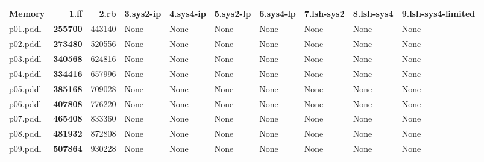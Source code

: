 \documentclass{article}
\begin{document}
\begin{tabular}{@{}lrrrrrrrrr@{}}
Memory & 1.ff & 2.rb & 3.sys2-ip & 4.sys4-ip & 5.sys2-lp & 6.sys4-lp & 7.lsh-sys2 & 8.lsh-sys4 & 9.lsh-sys4-limited \\
\midrule
p01.pddl & \textbf{255700} & 443140 & \multicolumn{1}{|l|}{None} & \multicolumn{1}{|l|}{None} & \multicolumn{1}{|l|}{None} & \multicolumn{1}{|l|}{None} & \multicolumn{1}{|l|}{None} & \multicolumn{1}{|l|}{None} & \multicolumn{1}{|l|}{None} \\
p02.pddl & \textbf{273480} & 520556 & \multicolumn{1}{|l|}{None} & \multicolumn{1}{|l|}{None} & \multicolumn{1}{|l|}{None} & \multicolumn{1}{|l|}{None} & \multicolumn{1}{|l|}{None} & \multicolumn{1}{|l|}{None} & \multicolumn{1}{|l|}{None} \\
p03.pddl & \textbf{340568} & 624816 & \multicolumn{1}{|l|}{None} & \multicolumn{1}{|l|}{None} & \multicolumn{1}{|l|}{None} & \multicolumn{1}{|l|}{None} & \multicolumn{1}{|l|}{None} & \multicolumn{1}{|l|}{None} & \multicolumn{1}{|l|}{None} \\
p04.pddl & \textbf{334416} & 657996 & \multicolumn{1}{|l|}{None} & \multicolumn{1}{|l|}{None} & \multicolumn{1}{|l|}{None} & \multicolumn{1}{|l|}{None} & \multicolumn{1}{|l|}{None} & \multicolumn{1}{|l|}{None} & \multicolumn{1}{|l|}{None} \\
p05.pddl & \textbf{385168} & 709028 & \multicolumn{1}{|l|}{None} & \multicolumn{1}{|l|}{None} & \multicolumn{1}{|l|}{None} & \multicolumn{1}{|l|}{None} & \multicolumn{1}{|l|}{None} & \multicolumn{1}{|l|}{None} & \multicolumn{1}{|l|}{None} \\
p06.pddl & \textbf{407808} & 776220 & \multicolumn{1}{|l|}{None} & \multicolumn{1}{|l|}{None} & \multicolumn{1}{|l|}{None} & \multicolumn{1}{|l|}{None} & \multicolumn{1}{|l|}{None} & \multicolumn{1}{|l|}{None} & \multicolumn{1}{|l|}{None} \\
p07.pddl & \textbf{465408} & 833360 & \multicolumn{1}{|l|}{None} & \multicolumn{1}{|l|}{None} & \multicolumn{1}{|l|}{None} & \multicolumn{1}{|l|}{None} & \multicolumn{1}{|l|}{None} & \multicolumn{1}{|l|}{None} & \multicolumn{1}{|l|}{None} \\
p08.pddl & \textbf{481932} & 872808 & \multicolumn{1}{|l|}{None} & \multicolumn{1}{|l|}{None} & \multicolumn{1}{|l|}{None} & \multicolumn{1}{|l|}{None} & \multicolumn{1}{|l|}{None} & \multicolumn{1}{|l|}{None} & \multicolumn{1}{|l|}{None} \\
p09.pddl & \textbf{507864} & 930228 & \multicolumn{1}{|l|}{None} & \multicolumn{1}{|l|}{None} & \multicolumn{1}{|l|}{None} & \multicolumn{1}{|l|}{None} & \multicolumn{1}{|l|}{None} & \multicolumn{1}{|l|}{None} & \multicolumn{1}{|l|}{None} \\

\end{tabular}
\end{document}
